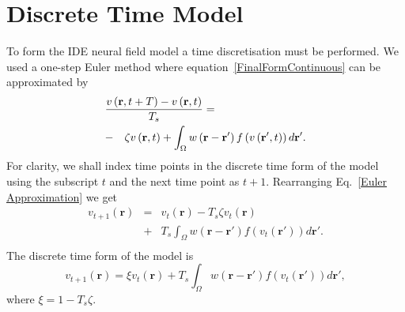 \documentclass[10pt,a4paper]{article}
\begin{document}
\section{Discrete Time Model}\label{Time Discretization} To form the IDE neural field model a time discretisation must be performed. We used a one-step Euler method where equation~\ref{FinalFormContinuous} can be approximated by 
\begin{eqnarray}
	\label{Euler Approximation} \lefteqn{\frac{v\left( \mathbf{r},t+T \right) - v\left( \mathbf{r},t\right)}{T_s} =}\nonumber\\
& -&\zeta v\left( \mathbf{r},t \right) + \int_\Omega {w\left( \mathbf{r}-\mathbf{r}' \right)f\left( {v\left( \mathbf{r}',t \right)} \right)d\mathbf{r}'}.\nonumber \\ 
\end{eqnarray}
For clarity, we shall index time points in the discrete time form of the model using the subscript $t$ and the next time point as $t+1$. Rearranging Eq.~\ref{Euler Approximation} we get 
\begin{eqnarray}
	\label{Euler Approximation2} v_{t+1}\left( \mathbf{r}\right) &=& v_t\left( \mathbf{r}\right) -T_s \zeta v_t\left( \mathbf{r}\right)\nonumber \\
&+& T_s \int_\Omega {w\left( \mathbf{r}-\mathbf{r}' \right)f\left( {v_t\left( \mathbf{r}'\right)} \right)d\mathbf{r}'}.\nonumber \\ 
\end{eqnarray}
The discrete time form of the model is 
\begin{equation}
	\label{Discrete Time Model1} v_{t+1}\left(\mathbf{r}\right) = \xi v_t\left(\mathbf{r}\right) + T_s \int_\Omega { w\left(\mathbf{r}-\mathbf{r}'\right) f\left(v_t\left(\mathbf{r}'\right)\right) d\mathbf{r}'}, 
\end{equation}
where $\xi = 1 - T_s \zeta$. 
\end{document}
